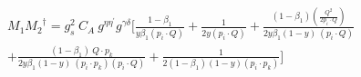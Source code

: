 \begin{equation}
\begin{split}
&M_1{M_2}^{\dagger}=g_s^2\: C_A\:g^{{{\eta}}{{\eta}^{\prime}}}g^{{{\gamma}}{{\delta}}}[\frac{1-\beta_1}{y\beta_1 (p_i \cdot Q)}+\frac{1}{2y(p_i \cdot Q)}+\frac{(1-\beta_1)(\frac{Q^2}{2p_i \cdot Q})}{2y\beta_1 (1-y)\:(p_i \cdot Q)}\\
&+\frac{(1-\beta_1)\:Q\cdot p_k}{2y\beta_1 (1-y)\:(p_i \cdot p_k)(p_i \cdot Q)}+\frac{1}{2(1-\beta_1)(1-y) (p_i \cdot p_k)}]\\
\end{split}
\end{equation}